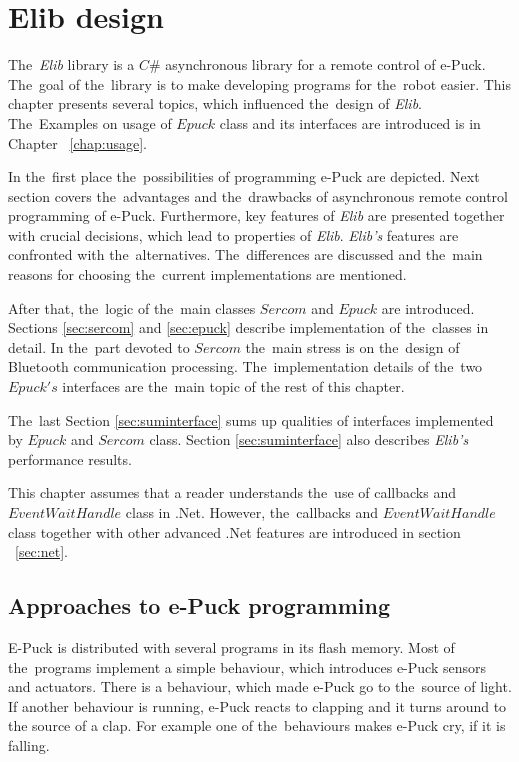 \chapter{Elib design} \label{chap:elib}
  The~{\it Elib} library is a $C\#$ asynchronous library for a remote control of e-Puck. 
  The~goal of the~library is to make developing programs for the~robot easier.
  This chapter presents several topics, which influenced the~design of {\it Elib}.
  The~Examples on usage of $Epuck$ class and its interfaces are introduced is in Chapter ~\ref{chap:usage}.

  In the~first place the~possibilities of programming e-Puck are depicted.
  Next section covers the~advantages and the~drawbacks of asynchronous remote control programming of e-Puck.
  Furthermore, key features of {\it Elib} are presented together with crucial decisions, which
  lead to properties of {\it Elib}. 
  {\it Elib's} features are confronted with the~alternatives. The~differences are discussed
  and the~main reasons for choosing the~current implementations are mentioned.

  After that, the~logic of the~main classes $Sercom$ and $Epuck$ are introduced. Sections 
  \ref{sec:sercom} and \ref{sec:epuck} describe implementation of the~classes in detail. 
  In the~part devoted to $Sercom$ the~main stress is on the~design of Bluetooth communication processing.
  The~implementation details of the~two $Epuck's$ interfaces are the~main topic of the rest of this chapter. 

  The~last Section \ref{sec:suminterface} sums up qualities of interfaces 
  implemented by $Epuck$ and $Sercom$ class.
  Section \ref{sec:suminterface} also describes {\it Elib's} performance results.

  This chapter assumes that a reader understands the~use of callbacks and $EventWaitHandle$ class in .Net.
  However, the~callbacks and $EventWaitHandle$ class together with other advanced .Net features 
  are introduced in section ~\ref{sec:net}.

\section{Approaches to e-Puck programming} \label{sec:approach}
  E-Puck is distributed with several programs in its flash memory. 
  Most of the~programs implement a simple behaviour, which introduces e-Puck sensors and actuators.
  There is a behaviour, which made e-Puck go to the~source of light.
  If another behaviour is running, e-Puck
  reacts to clapping and it turns around to the source of a clap. For example one of the~behaviours makes
  e-Puck cry, if it is falling.
   
